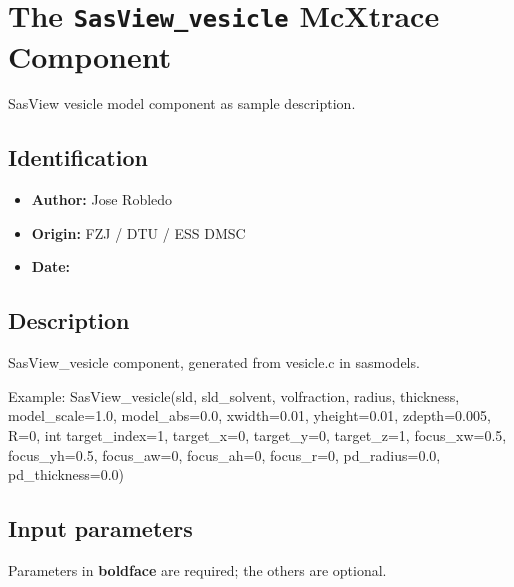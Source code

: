 \section{The \texttt{SasView\_vesicle} McXtrace Component}
SasView vesicle model component as sample description.

\subsection*{Identification}
\begin{itemize}
  \item \textbf{Author:} Jose Robledo
  \item \textbf{Origin:} FZJ / DTU / ESS DMSC
  \item \textbf{Date:} 
\end{itemize}

\subsection*{Description}
SasView\_vesicle component, generated from vesicle.c in sasmodels.

Example: SasView\_vesicle(sld, sld\_solvent, volfraction, radius, thickness, model\_scale=1.0, model\_abs=0.0, xwidth=0.01, yheight=0.01, zdepth=0.005, R=0, int target\_index=1, target\_x=0, target\_y=0, target\_z=1, focus\_xw=0.5, focus\_yh=0.5, focus\_aw=0, focus\_ah=0, focus\_r=0, pd\_radius=0.0, pd\_thickness=0.0)

\subsection*{Input parameters}
Parameters in \textbf{boldface} are required; the others are optional.

